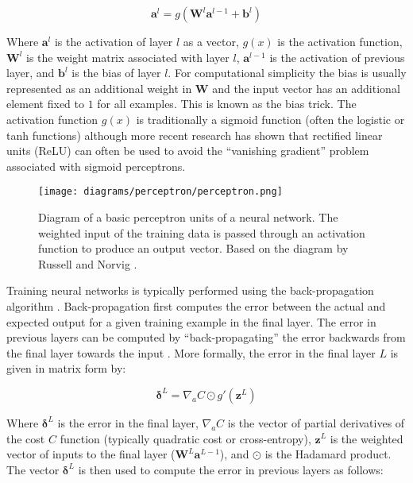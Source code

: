 \documentclass[journal]{IEEEtran}
\begin{document}
\begin{equation}
\label{eq:feedforward}
	\bm{a}^l = g(\bm{W}^l \bm{a}^{l-1} + \bm{b}^l)
\end{equation}

Where $\bm{a}^l$ is the activation of layer $l$ as a vector, $g(x)$ is the activation function, $\bm{W}^l$ is the weight matrix associated with layer $l$, $\bm{a}^{l-1}$ is the activation of previous layer, and $\bm{b}^l$ is the bias of layer $l$. For computational simplicity the bias is usually represented as an additional weight in $\bm{W}$ and the input vector has an additional element fixed to $1$ for all examples. This is known as the bias trick. The activation function $g(x)$ is traditionally a sigmoid function (often the logistic or tanh functions) \cite{lecun2012efficient} although more recent research has shown that rectified linear units (ReLU) \cite{glorot2011deep} can often be used to avoid the ``vanishing gradient'' problem associated with sigmoid perceptrons.

\begin{figure}[h!]
\centering
\texttt{[image: diagrams/perceptron/perceptron.png]}
\caption{Diagram of a basic perceptron units of a neural network. The weighted input of the training data is passed through an activation function to produce an output vector. Based on the diagram by Russell and Norvig \cite{russell1995artificial}.}
\label{fig:perceptron}
\end{figure}

Training neural networks is typically performed using the back-propagation algorithm \cite{lecun2012efficient}. Back-propagation first computes the error between the actual and expected output for a given training example in the final layer. The error in previous layers can be computed by ``back-propagating'' the error backwards from the final layer towards the input \cite{nnanddeeplearning}. More formally, the error in the final layer $L$ is given in matrix form by:

\begin{equation}
\label{eq:backprop1}
	\bm{\delta}^L = \nabla_a C \odot g'(\bm{z}^L)
\end{equation}

Where $\bm{\delta}^L$ is the error in the final layer, $\nabla_a C$ is the vector of partial derivatives of the cost $C$ function (typically quadratic cost or cross-entropy), $\bm{z}^L$ is the weighted vector of inputs to the final layer ($\bm{W}^L\bm{a}^{L-1}$), and $\odot$ is the Hadamard product. The vector $\bm{\delta}^L$ is then used to compute the error in previous layers as follows:
\end{document}
